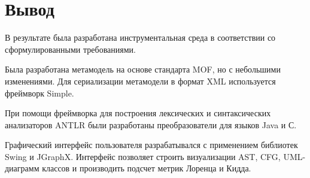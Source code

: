 \section{Вывод}

В результате была разработана инструментальная среда в соответствии со
сформулированными требованиями.

Была разработана метамодель на основе стандарта MOF, но с небольшими изменениями.
Для сериализации метамодели в формат XML используется фреймворк Simple.

При помощи фреймворка для построения лексических и синтаксических анализаторов
ANTLR были разработаны преобразователи для языков Java и С.

Графический интерфейс пользователя разрабатывался с применением библиотек Swing
и JGraphX. Интерфейс позволяет строить визуализации AST, CFG, UML-диаграмм
классов и производить подсчет метрик Лоренца и Кидда.
